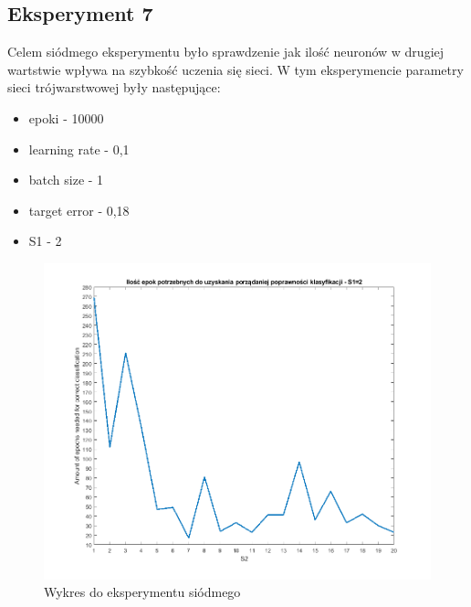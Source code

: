 \documentclass[12pt,twoside]{article}
\begin{document}
\subsection{Eksperyment 7}
Celem siódmego eksperymentu było sprawdzenie jak ilość neuronów w drugiej wartstwie wpływa na szybkość uczenia się sieci.
W tym eksperymencie parametry sieci trójwarstwowej były następujące:
\begin{itemize}
	\item epoki - 10000
	\item learning rate - 0,1
	\item batch size - 1
	\item target error - 0,18
	\item S1 - 2
\end{itemize}
\begin{figure}[ht!]
	\centering
	\includegraphics[width=15cm]{figures/S1=2_S2_epo.png}
	\caption{Wykres do eksperymentu siódmego}
\end{figure}
\newpage
\end{document}
